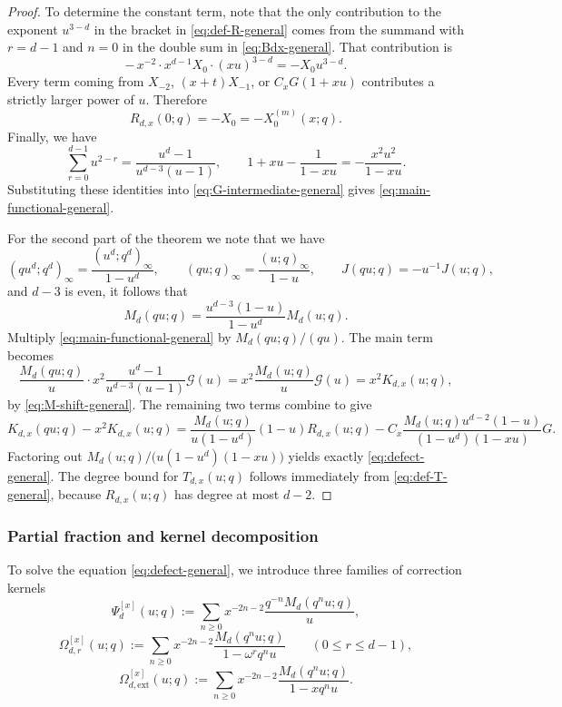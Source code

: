 \documentclass[12pt]{amsart}
\numberwithin{equation}{section}
\begin{document}
\begin{proof}
To determine the constant term, note that the only contribution to the exponent $u^{3-d}$ in the bracket in \eqref{eq:def-R-general} comes from the summand with $r=d-1$ and $n=0$ in the double sum in \eqref{eq:Bdx-general}.  That contribution is
\[
-\,x^{-2}\cdot x^{d-1}X_0\cdot (xu)^{3-d}=-X_0u^{3-d}.
\]
Every term coming from $X_{-2}$, $(x+t)X_{-1}$, or $C_xG(1+xu)$ contributes a strictly larger power of $u$.  Therefore
\[
R_{d,x}(0;q)=-X_0=-X_0^{(m)}(x;q).
\]
Finally, we have
\[
\sum_{r=0}^{d-1}u^{2-r}=\frac{u^d-1}{u^{d-3}(u-1)},
\qquad
1+xu-\frac1{1-xu}=-\frac{x^2u^2}{1-xu}.
\]
Substituting these identities into \eqref{eq:G-intermediate-general} gives \eqref{eq:main-functional-general}.


For the second part of the theorem we note that we have
\[
(qu^d;q^d)_\infty=\frac{(u^d;q^d)_\infty}{1-u^d},
\qquad
(qu;q)_\infty=\frac{(u;q)_\infty}{1-u},
\qquad
J(qu;q)=-u^{-1}J(u;q),
\]
and $d-3$ is even, it follows that
\begin{equation}\label{eq:M-shift-general}
M_d(qu;q)=\frac{u^{d-3}(1-u)}{1-u^d}M_d(u;q).
\end{equation}
Multiply \eqref{eq:main-functional-general} by $M_d(qu;q)/(qu)$.  The main term becomes
\[
\frac{M_d(qu;q)}{u}\cdot x^2\frac{u^d-1}{u^{d-3}(u-1)}\mathcal G(u)
=
x^2\frac{M_d(u;q)}{u}\mathcal G(u)=x^2K_{d,x}(u;q),
\]
by \eqref{eq:M-shift-general}.  The remaining two terms combine to give
\[
K_{d,x}(qu;q)-x^2K_{d,x}(u;q)
=
\frac{M_d(u;q)}{u(1-u^d)}(1-u)R_{d,x}(u;q)
-
C_x\frac{M_d(u;q)u^{d-2}(1-u)}{(1-u^d)(1-xu)}G.
\]
Factoring out $M_d(u;q)/\bigl(u(1-u^d)(1-xu)\bigr)$ yields exactly \eqref{eq:defect-general}.  The degree bound for $T_{d,x}(u;q)$ follows immediately from \eqref{eq:def-T-general}, because $R_{d,x}(u;q)$ has degree at most $d-2$.

\end{proof}


\subsubsection{Partial fraction and kernel decomposition}

To solve the equation \eqref{eq:defect-general}, we introduce three families of correction kernels 
\begin{equation}\label{eq:correction-kernels-general}
\Psi_d^{[x]}(u;q):=\sum_{n\geq 0}x^{-2n-2}\frac{q^{-n}M_d(q^nu;q)}{u},
\end{equation}
\begin{equation}\label{eq:omega-r-general}
\Omega_{d,r}^{[x]}(u;q):=\sum_{n\geq 0}x^{-2n-2}\frac{M_d(q^nu;q)}{1-\omega^rq^nu}
\qquad (0\leq r\leq d-1),
\end{equation}
\begin{equation}\label{eq:omega-x-general}
\Omega_{d,\mathrm{ext}}^{[x]}(u;q):=\sum_{n\geq 0}x^{-2n-2}\frac{M_d(q^nu;q)}{1-xq^nu}.
\end{equation}
\end{document}
